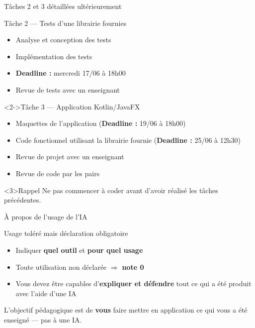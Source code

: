 \documentclass[french,10pt,dvipsnames,table]{beamer}%
\begin{document}
\begin{frame}{Tâches 2 et 3 détaillées ultérieurement}
  \begin{block}{Tâche 2 — Tests d'une librairie fournies}
    \begin{itemize}
      \item Analyse et conception des tests
      \item Implémentation des tests 
      \item \textbf{Deadline :} mercredi 17/06 à 18h00
      \item Revue de tests avec un enseignant
    \end{itemize}
  \end{block}
  \begin{block}<2->{Tâche 3 — Application Kotlin/JavaFX}
    \begin{itemize}
      \item Maquettes de l'application (\textbf{Deadline :} 19/06 à 18h00)
      \item Code fonctionnel utilisant la librairie fournie (\textbf{Deadline :} 25/06 à 12h30)
      \item Revue de projet avec un enseignant
      \item Revue de code par les pairs
    \end{itemize}
  \end{block}
  \begin{alertblock}<3>{Rappel}
    Ne pas commencer à coder avant d'avoir réalisé les tâches précédentes.
  \end{alertblock}
\end{frame}

\begin{frame}{À propos de l'usage de l'IA}
  \begin{alertblock}{Usage toléré mais déclaration obligatoire}
    \begin{itemize}
      \item Indiquer \textbf{quel outil} et \textbf{pour quel usage}
      \item Toute utilisation non déclarée $\Rightarrow$ \textbf{note 0}
      \item Vous devez être capables d'\textbf{expliquer et défendre} tout ce qui a été produit avec l'aide d'une IA
    \end{itemize}
  \end{alertblock}
  \bigskip
  L'objectif pédagogique est de \textbf{vous} faire mettre en application ce qui vous a été enseigné — pas à une IA.
\end{frame}
\end{document}
